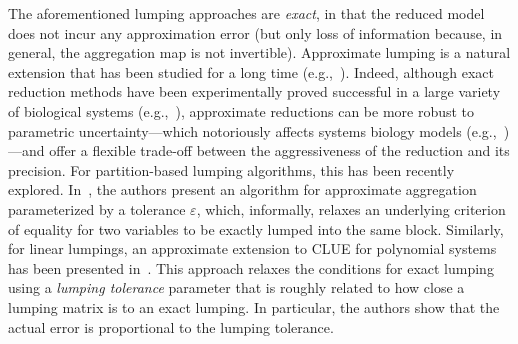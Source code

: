 The aforementioned lumping approaches are \emph{exact}, in that the reduced model does not incur any approximation error (but only loss of information because, in general, the aggregation map is not invertible).
Approximate lumping is a natural extension that has been studied for a long time (e.g.,~\cite{LI1990977}).
Indeed, although exact reduction methods have been experimentally proved successful in a large variety of biological systems (e.g.,~\cite{SBML}), approximate reductions can be more robust to parametric uncertainty---which notoriously affects systems biology models (e.g.,~\cite{doi:10.1098/rsif.2017.0237,DBLP:conf/cmsb/BarnatBBDHPS17})---and offer a flexible trade-off between the aggressiveness of the reduction and its precision.
For partition-based lumping algorithms, this has been recently explored.
In~\cite{DBLP:conf/qest/CardelliTTV18}, the authors present an algorithm for approximate aggregation parameterized by a tolerance $\varepsilon$, which, informally, relaxes an underlying criterion of equality for two variables to be exactly lumped into the same block.
Similarly, for linear lumpings, an approximate extension to CLUE for polynomial systems has been presented in~\cite{leguizamon-robayo_approximate_2023}.
This approach relaxes the conditions for exact lumping using a \emph{lumping tolerance} parameter that is roughly related to how close a lumping matrix is to an exact lumping.
In particular, the authors show that the actual error is proportional to the lumping tolerance.



